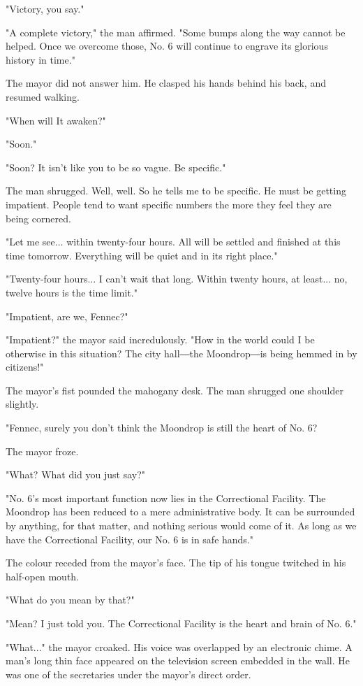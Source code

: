 "Victory, you say."

"A complete victory," the man affirmed. "Some bumps along the way cannot
be helped. Once we overcome those, No. 6 will continue to engrave its
glorious history in time."

The mayor did not answer him. He clasped his hands behind his back, and
resumed walking.

"When will It awaken?"

"Soon."

"Soon? It isn't like you to be so vague. Be specific."

The man shrugged. Well, well. So he tells me to be specific. He must be
getting impatient. People tend to want specific numbers the more they
feel they are being cornered.

"Let me see... within twenty-four hours. All will be settled and
finished at this time tomorrow. Everything will be quiet and in its
right place."

"Twenty-four hours... I can't wait that long. Within twenty hours, at
least... no, twelve hours is the time limit."

"Impatient, are we, Fennec?"

"Impatient?" the mayor said incredulously. "How in the world could I be
otherwise in this situation? The city hall―the Moondrop―is being hemmed
in by citizens!"

The mayor's fist pounded the mahogany desk. The man shrugged one
shoulder slightly.

"Fennec, surely you don't think the Moondrop is still the heart of No.
6?

The mayor froze.

"What? What did you just say?"

"No. 6's most important function now lies in the Correctional Facility.
The Moondrop has been reduced to a mere administrative body. It can be
surrounded by anything, for that matter, and nothing serious would come
of it. As long as we have the Correctional Facility, our No. 6 is in
safe hands."

The colour receded from the mayor's face. The tip of his tongue twitched
in his half-open mouth.

"What do you mean by that?"

"Mean? I just told you. The Correctional Facility is the heart and brain
of No. 6."

"What..." the mayor croaked. His voice was overlapped by an electronic
chime. A man's long thin face appeared on the television screen embedded
in the wall. He was one of the secretaries under the mayor's direct
order.

